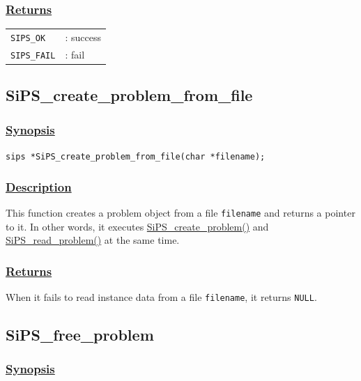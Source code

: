 \documentclass[a4paper]{book}
\begin{document}
\subsubsection{\underline{Returns}}

\begin{tabular}{ll}
  \verb+SIPS_OK+  &: success\\
  \verb+SIPS_FAIL+&: fail\\
\end{tabular}

\hypertarget{SiPS_create_problem_from_file}{%
\subsection{SiPS\_create\_problem\_from\_file}
}

\subsubsection{\underline{Synopsis}}

\verb+sips *SiPS_create_problem_from_file(char *filename);+

\subsubsection{\underline{Description}}

This function creates a problem object from a file \verb+filename+ and returns a pointer to it.
In other words, it executes \hyperlink{SiPS_create_problem}{SiPS\_create\_problem()} and\linebreak
\hyperlink{SiPS_read_problem}{SiPS\_read\_problem()} at the same time.

\subsubsection{\underline{Returns}}

When it fails to read instance data from a file \verb+filename+, it returns \verb+NULL+.


\hypertarget{SiPS_free_problem}{%
\subsection{SiPS\_free\_problem}
}

\subsubsection{\underline{Synopsis}}
\end{document}

